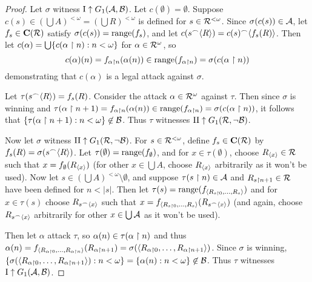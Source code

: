 \documentclass{amsart}
\theoremstyle{plain}
\theoremstyle{definition}
\theoremstyle{remark}
\theoremstyle{plain}
\theoremstyle{definition}
\theoremstyle{remark}
\begin{document}
\begin{proof}
  Let \(\sigma\) witness 
  \(\mathrm{I}\uparrow G_{1}(\mathcal{A},\mathcal{B})\).
  Let \(c(\emptyset)=\emptyset\). Suppose 
  \(c(s)\in(\bigcup A)^{<\omega}=(\bigcup R)^{<\omega}\)
  is defined for \(s\in\mathcal{R}^{<\omega}\). Since \(\sigma(c(s))\in\mathcal{A}\),
  let \(f_s\in\mathbf C(\mathcal{R})\) satisfy \(\sigma(c(s))=\text{range}(f_s)\),
  and let \(c(s{^\frown}\langle R\rangle)=c(s){^\frown}\langle f_s(R)\rangle\).
  Then let \(c(\alpha)=\bigcup\{c(\alpha\restriction n):n<\omega\}\)
  for \(\alpha\in\mathcal{R}^\omega\), so
  \[
    c(\alpha)(n)
      =
    f_{\alpha\restriction n}(\alpha(n))
      \in
    \text{range}(f_{\alpha\restriction n})
      =
    \sigma(c(\alpha\restriction n))
  \]
  demonstrating that \(c(\alpha)\) is a legal attack against \(\sigma\).

  Let \(\tau(s{^\frown}\langle R\rangle)=f_s(R)\). Consider the attack \(\alpha\in\mathcal{R}^\omega\)
  against \(\tau\). Then since \(\sigma\) is winning and
  \(
    \tau(\alpha\restriction n+1)=f_{\alpha\restriction n}(\alpha(n))\in
    \text{range}(f_{\alpha\restriction n})=\sigma(c(\alpha\restriction n))
  \), it follows that \(\{\tau(\alpha\restriction n+1):n<\omega\}\not\in\mathcal{B}\).
  Thus \(\tau\) witnesses
  \(\mathrm{II}\uparrow G_{1}(\mathcal{R},\neg\mathcal{B})\).

  Now let \(\sigma\) witness
  \(\mathrm{II}\uparrow G_{1}(\mathcal{R},\neg\mathcal{B})\).
  For \(s\in \mathcal{R}^{<\omega}\), define \(f_s\in\mathbf C(\mathcal{R})\)
  by \(f_s(R)=\sigma(s{^\frown}\langle R\rangle)\). Let \(\tau(\emptyset)=\text{range}(f_\emptyset)\),
  and for \(x\in\tau(\emptyset)\), choose \(R_{\langle x\rangle}\in\mathcal{R}\) such that
  \(x=f_{\emptyset}(R_{\langle x\rangle})\) (for other \(x\in\bigcup A\), choose \(R_{\langle x\rangle}\)
  arbitrarily as it won't be used). Now let \(s\in(\bigcup A)^{<\omega}\setminus\emptyset\),
  and suppose \(\tau(s\restriction n)\in\mathcal{A}\) and \(R_{s\restriction n+1}\in\mathcal{R}\) have been
  defined for \(n<|s|\). Then let \(\tau(s)=\text{range}(f_{\langle R_{s\restriction 0},\dots,R_s\rangle})\)
  and for \(x\in\tau(s)\) choose \(R_{s{^\frown}\langle x\rangle}\) such that
  \(x=f_{\langle R_{s\restriction 0},\dots,R_s\rangle}(R_{s{^\frown}\langle x\rangle})\) (and again,
  choose \(R_{s{^\frown}\langle x\rangle}\) arbitrarily for other \(x\in\bigcup\mathcal{A}\) as it won't be used).

  Then let \(\alpha\) attack \(\tau\), so
  \(\alpha(n)\in\tau(\alpha\restriction n)\) and thus 
  \(\alpha(n)=f_{\langle R_{\alpha\restriction 0},\dots,R_{\alpha\restriction n}\rangle}(R_{\alpha\restriction n+1})
  =\sigma(\langle R_{\alpha\restriction 0},\dots,R_{\alpha\restriction n+1}\rangle)\).  Since \(\sigma\) is winning,
  \(\{\sigma(\langle R_{\alpha\restriction 0},\dots,R_{\alpha\restriction n+1}\rangle):n<\omega\}
  =\{\alpha(n):n<\omega\}\not\in\mathcal{B}\).
  Thus \(\tau\) witnesses
  \(\mathrm{I}\uparrow G_{1}(\mathcal{A},\mathcal{B})\).
\end{proof}
\end{document}
